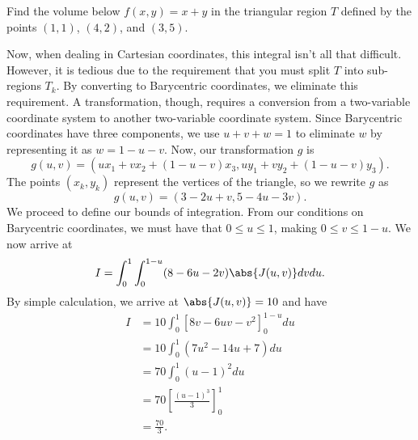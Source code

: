 \begin{example}
    Find the volume below $f(x, y) = x + y$ in the triangular region $T$ defined by the points $(1, 1)$, $(4, 2)$, and $(3, 5)$.
    
    \begin{soln}
        Now, when dealing in Cartesian coordinates, this integral isn't all that difficult. However, it is tedious due to the requirement that you must split $T$ into sub-regions $T_{k}$. By converting to Barycentric coordinates, we eliminate this requirement. A transformation, though, requires a conversion from a two-variable coordinate system to another two-variable coordinate system. Since Barycentric coordinates have three components, we use $u + v + w = 1$ to eliminate $w$ by representing it as $w = 1 - u - v$. Now, our transformation $g$ is
        \[g(u, v) = (ux_{1} + vx_{2} + (1 - u - v)x_{3}, uy_{1} + vy_{2} + (1 - u - v)y_{3}).\]
        The points $(x_{k}, y_{k})$ represent the vertices of the triangle, so we rewrite $g$ as
        \[g(u, v) = (3 - 2u + v, 5 - 4u - 3v).\]
        We proceed to define our bounds of integration. From our conditions on Barycentric coordinates, we must have that $0 \leq u \leq 1$, making $0 \leq v \leq 1 - u$. We now arrive at
        \[I = \int_{0}^{1}\int_{0}^{1 - u}(8 - 6u - 2v)\abs{J(u, v)}dvdu.\]
        By simple calculation, we arrive at $\abs{J(u, v)} = 10$ and have
        \begin{align*}
            I &= 10\int_{0}^{1}\left[8v - 6uv - v^{2}\right]_{0}^{1 - u}du \\
            &= 10\int_{0}^{1}(7u^{2} - 14u + 7)du \\
            &= 70\int_{0}^{1}(u - 1)^{2}du \\
            &= 70\left[\frac{(u - 1)^{3}}{3}\right]_{0}^{1} \\
            &= \frac{70}{3}.
        \end{align*}
    \end{soln}
\end{example}

